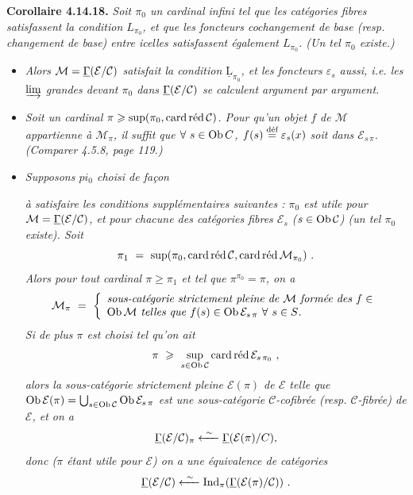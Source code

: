 \textbf{Corollaire 4.14.18.} \textit{Soit $\pi_0$ un cardinal infini tel que les catégories fibres satisfassent la condition $L_{\pi_0}$, et que les foncteurs cochangement de base (resp. changement de base) entre icelles satisfassent également $L_{\pi_0}$. (Un tel $\pi_0$ existe.)}
\begin{itemize}[nosep]
\item[\circled{a}] \textit{Alors $\mathcal{M} = \uGamma(\mathcal{E}/\mathcal{C})$ satisfait la condition $\underline{\mathrm{L}}_{\pi_0}$, et les foncteurs $\varepsilon_s$ aussi, i.e. les $\varinjlim$ grandes devant $\pi_0$ dans $\uGamma(\mathcal{E}/\mathcal{C})$ se calculent argument par argument.}
\item[\circled{b}] \textit{Soit un cardinal $\pi \geqslant \sup(\pi_0,\cardred\mathcal{C})$. Pour qu'un objet $f$ de $\mathcal{M}$ appartienne à $\mathcal{M}_\pi$, il \textup{suffit} que $\forall\ s \in \Ob C$, $f(s) \defeq \varepsilon_s(x)$ soit dans $\mathcal{E}_{s\,\pi}$. (Comparer 4.5.8, page 119.)} %
\item[\circled{c}] \textit{Supposons $pi_0$ choisi de façon} %

\textit{à satisfaire les conditions supplémentaires suivantes : $\pi_0$ est utile pour $\mathcal{M} = \uGamma(\mathcal{E}/\mathcal{C})$, et pour chacune des catégories fibres $\mathcal{E}_s$ ($s \in \Ob\mathcal{C}$) (un tel $\pi_0$ existe). Soit}
\[
\pi_1 \ = \ \sup(\pi_0, \cardred\mathcal{C}, \cardred\mathcal{M}_{\pi_0}) \ .
\]
\textit{Alors pour tout cardinal $\pi \geqslant \pi_1$ et tel que $\pi^{\pi_0} = \pi$, on a}
\[
\mathcal{M}_\pi \ = \ \left\{
\begin{array}{l}
\textit{sous-catégorie strictement pleine de $\mathcal{M}$ formée des $f \in$} \\
\textit{$\Ob\mathcal{M}$ telles que $f(s) \in \Ob\mathcal{E}_{s\,\pi}$ $\forall\ s \in S$.} %
\end{array}
\right.
\]
\textit{Si de plus $\pi$ est choisi tel qu'on ait}
\[
\pi \ \geqslant \ \sup_{s\in\Ob\mathcal{C}} \cardred\mathcal{E}_{s\,\pi_0} \ ,
\]
\textit{alors la sous-catégorie strictement pleine $\mathcal{E}(\pi)$ de $\mathcal{E}$ telle que $\Ob\mathcal{E}(\pi) = \bigcup_{s\in\Ob\mathcal{C}} \Ob\mathcal{E}_{s\,\pi}$ est une sous-catégorie $\mathcal{C}$-cofibrée (resp. $\mathcal{C}$-fibrée) de $\mathcal{E}$, et on a}
\[
\uGamma(\mathcal{E}/\mathcal{C})_\pi \xleftarrow{\ \sim\ } \uGamma(\mathcal{E}(\pi)/C), %
\]
\textit{donc ($\pi$ étant utile pour $\mathcal{E}$) on a une équivalence de catégories}
\[
\uGamma(\mathcal{E}/\mathcal{C}) \xleftarrow{\ \sim\ } \Ind_\pi(\uGamma(\mathcal{E}(\pi)/\mathcal{C})) \ .
\]
\end{itemize}

